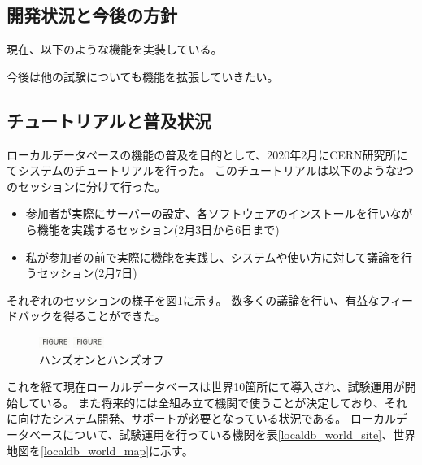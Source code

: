 \subsection{開発状況と今後の方針}
現在、以下のような機能を実装している。

今後は他の試験についても機能を拡張していきたい。

\subsection{チュートリアルと普及状況}
ローカルデータベースの機能の普及を目的として、2020年2月にCERN研究所にてシステムのチュートリアルを行った。
このチュートリアルは以下のような2つのセッションに分けて行った。

\begin{itemize}
  \item 参加者が実際にサーバーの設定、各ソフトウェアのインストールを行いながら機能を実践するセッション(2月3日から6日まで)
  \item 私が参加者の前で実際に機能を実践し、システムや使い方に対して議論を行うセッション(2月7日)
\end{itemize}

それぞれのセッションの様子を図\ref{Tutorial_picture}に示す。
数多くの議論を行い、有益なフィードバックを得ることができた。

\begin{figure}[bpt]
  \begin{center}
  \begin{minipage}{0.4\hsize}
    \includegraphics[width=10mm]{figure}
  \end{minipage}
  \begin{minipage}{0.4\hsize}
    \includegraphics[width=10mm]{figure}
  \end{minipage}
  \caption[ハンズオンとハンズオフ]{ハンズオンとハンズオフ}
  \label{Tutorial_picture}
  \end{center}
\end{figure}

これを経て現在ローカルデータベースは世界10箇所にて導入され、試験運用が開始している。
また将来的には全組み立て機関で使うことが決定しており、それに向けたシステム開発、サポートが必要となっている状況である。
ローカルデータベースについて、試験運用を行っている機関を表\ref{localdb_world_site}、世界地図を\ref{localdb_world_map}に示す。

